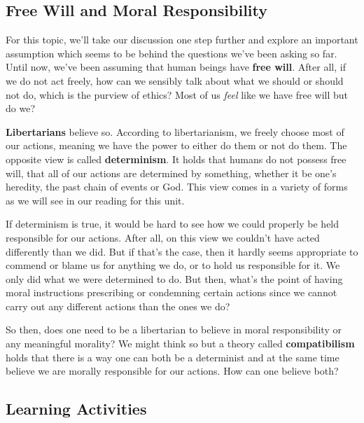 \documentclass[
]{book}
\begin{document}
\hypertarget{free-will-and-moral-responsibility}{%
\subsection*{Free Will and Moral Responsibility}\label{free-will-and-moral-responsibility}}

For this topic, we'll take our discussion one step further and explore an important assumption which seems to be behind the questions we've been asking so far. Until now, we've been assuming that human beings have \textbf{free will}. After all, if we do not act freely, how can we sensibly talk about what we should or should not do, which is the purview of ethics? Most of us \emph{feel} like we have free will but do we?

\textbf{Libertarians} believe so. According to libertarianism, we freely choose most of our actions, meaning we have the power to either do them or not do them. The opposite view is called \textbf{determinism}. It holds that humans do not possess free will, that all of our actions are determined by something, whether it be one's heredity, the past chain of events or God. This view comes in a variety of forms as we will see in our reading for this unit.

If determinism is true, it would be hard to see how we could properly be held responsible for our actions. After all, on this view we couldn't have acted differently than we did. But if that's the case, then it hardly seems appropriate to commend or blame us for anything we do, or to hold us responsible for it. We only did what we were determined to do. But then, what's the point of having moral instructions prescribing or condemning certain actions since we cannot carry out any different actions than the ones we do?

So then, does one need to be a libertarian to believe in moral responsibility or any meaningful morality? We might think so but a theory called \textbf{compatibilism} holds that there is a way one can both be a determinist and at the same time believe we are morally responsible for our actions. How can one believe both?

\hypertarget{learning-activities-5}{%
\subsection*{Learning Activities}\label{learning-activities-5}}
\end{document}

